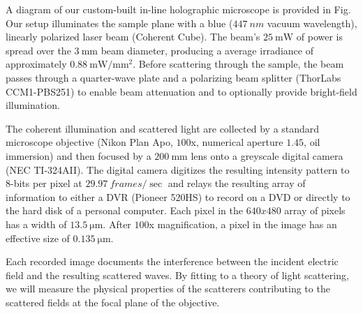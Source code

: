 A diagram of our custom-built in-line holographic microscope
is provided in Fig.~%
Our setup illuminates
the sample plane with a blue ($\SI{447}{nm}$ vacuum wavelength),
linearly polarized laser beam (Coherent Cube). The beam's
$\SI{25}{\mW}$ of power is spread over the $\SI{3}{\mm}$ beam
diameter, producing a average irradiance of approximately
$\SI{0.88}{\mW / \mm^2}$. Before scattering through the
sample, the beam passes through a quarter-wave plate and a
polarizing beam splitter (ThorLabs CCM1-PBS251) to enable
beam attenuation and to optionally provide bright-field
illumination.

The coherent illumination and scattered light are collected by a
standard microscope objective (Nikon Plan Apo, $\num{100}$x,
numerical aperture $\num{1.45}$, oil immersion) and then focused
by a $\SI{200}{\mm}$ lens onto a greyscale digital camera
(NEC TI-324AII). The digital camera digitizes the resulting intensity
pattern to $8$-bits per pixel at $\SI{29.97}{frames / \sec}$ and relays the
resulting array of information to either a DVR (Pioneer 520HS) to record
on a DVD or directly to the hard disk of a personal computer.
Each pixel in the $\si{640 x 480}$ array of pixels has a width of
$\SI{13.5}{\um}$. After $100$x magnification, a pixel in the
image has an effective size of $\SI{0.135}{\um}$.

Each recorded image documents the interference between the incident
electric field and the resulting scattered waves. By fitting
to a theory of light scattering, we will measure the physical
properties of the scatterers contributing to the scattered fields
at the focal plane of the objective.





